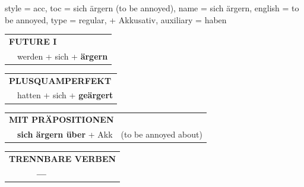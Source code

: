 \begin{verbentry}{
  style = {acc},
  toc = {sich ärgern (to be annoyed)},
  name = {sich ärgern},
  english = {to be annoyed},
  type = {regular, + Akkusativ},
  auxiliary = {haben}
}
\begin{tabular}{rl}
    \multicolumn{2}{l}{\textbf{FUTURE I} }\\
    &werden + sich + \textbf{ärgern}\\
 
  \end{tabular}
\hfill
   \begin{tabular}{rl}
      \multicolumn{2}{l}{\textbf{PLUSQUAMPERFEKT}}\\
    &hatten + sich + \textbf{geärgert}\\
  \end{tabular}
  
\vspace{10pt}

   \begin{tabular}{lll}
      \multicolumn{3}{l}{\textbf{MIT PRÄPOSITIONEN}}\\
& \textbf{sich ärgern über} + Akk & (to be annoyed about)
  \end{tabular}
\hfill
\begin{tabular}{lll}
\multicolumn{3}{l}{\textbf{TRENNBARE VERBEN}}\\
& \textbf{---} & \\
\end{tabular}
  
  \vspace{-5pt}
\end{verbentry}

